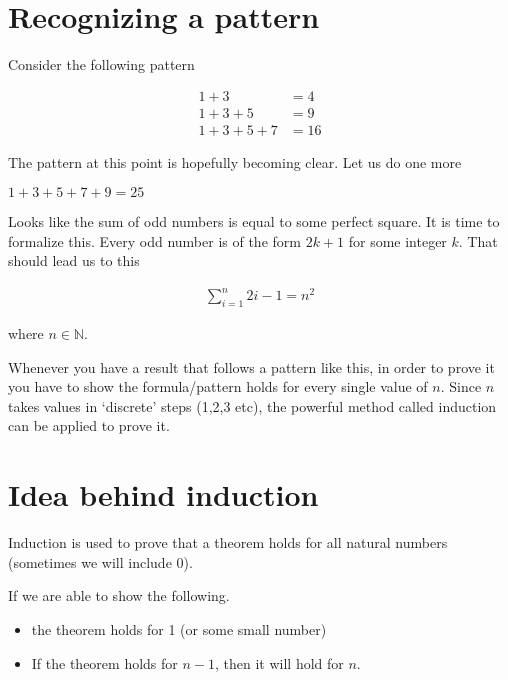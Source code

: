 \documentclass[12pt]{article}
\begin{document}
\begin{center}
\\
\vspace{1cm}
\end{center}

\vspace{0.5cm}\noindent


\section*{Recognizing a pattern}

Consider the following pattern

\begin{align*}
 1 + 3 &= 4 \\
 1 + 3 +  5 &= 9 \\
 1 + 3 + 5 + 7 &= 16
\end{align*}


The pattern at this point is hopefully becoming clear. Let us do one more

$1 + 3 + 5 + 7 + 9 = 25$

Looks like the sum of odd numbers is equal to some perfect square. It is time to formalize this.
Every odd number is of the form $2k + 1$ for some integer $k$. That should lead us to this

\begin{align*}
\sum_{i=1}^n 2i - 1 = n^2
\end{align*}

where $n \in \mathbb{N}$.

Whenever you have a result that follows a pattern like this, in order to prove it you have to show the formula/pattern holds for every single value of $n$. Since $n$ takes values in `discrete' steps (1,2,3 etc), the powerful method called induction can be applied to prove it.
 
\section*{Idea behind induction}
Induction is used to prove that a theorem holds for all natural numbers (sometimes we will include 0). 

If we are able to show the following. 

\begin{itemize}
\item the theorem holds for 1 (or some small number)
\item If the theorem holds for $n-1$, then it will hold for $n$.
\end{itemize}
\end{document}

